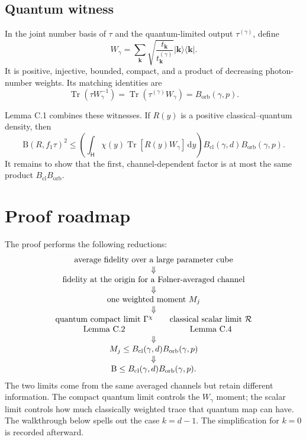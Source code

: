 \documentclass[11pt]{article}
\newcommand{\Hc}{\mathsf H}
\newcommand{\Tr}{\operatorname{Tr}}
\newcommand{\dd}{\,\mathrm d}
\newcommand{\B}{\mathrm B}
\newcommand{\Bcl}{B_{\mathrm{cl}}}
\newcommand{\Borb}{B_{\mathrm{orb}}}
\begin{document}
\subsection{Quantum witness}

In the joint number basis of $\tau$ and the quantum-limited output
$\tau^{(\gamma)}$, define
\begin{equation}\label{eq:W}
  W_\gamma
  =\sum_{\mathbf k}
  \sqrt{\frac{t_{\mathbf k}}{t_{\mathbf k}^{(\gamma)}}}
  |\mathbf k\rangle\!\langle\mathbf k|.
\end{equation}
It is positive, injective, bounded, compact, and a product of decreasing
photon-number weights.  Its matching identities are
\begin{equation}\label{eq:quantum-id}
  \Tr(\tau W_\gamma^{-1})
  =\Tr(\tau^{(\gamma)}W_\gamma)
  =\Borb(\gamma,p).
\end{equation}

Lemma C.1 combines these witnesses.  If $R(y)$ is a positive
classical--quantum density, then
\begin{equation}\label{eq:weighted-hybrid}
  \B(R,f_1\tau)^2
  \leq
  \left(\int_{\Hc}\chi(y)\Tr[R(y)W_\gamma]\dd y\right)
  \Bcl(\gamma,d)\Borb(\gamma,p).
\end{equation}
It remains to show that the first, channel-dependent factor is at most the
same product $\Bcl\Borb$.

\section{Proof roadmap}

The proof performs the following reductions:
\[
\begin{array}{c}
\text{average fidelity over a large parameter cube}\\
\Downarrow\\
\text{fidelity at the origin for a F\o lner-averaged channel}\\
\Downarrow\\
\text{one weighted moment }M_j\\
\Downarrow\\
\begin{array}{c@{\qquad}c}
\text{quantum compact limit }\Gamma^\chi
&\text{classical scalar limit }\mathcal R\\
\text{Lemma C.2}&\text{Lemma C.4}
\end{array}\\
\Downarrow\\
M_j\leq\Bcl(\gamma,d)\Borb(\gamma,p)\\
\Downarrow\\
\B\leq\Bcl(\gamma,d)\Borb(\gamma,p).
\end{array}
\]
The two limits come from the same averaged channels but retain different
information.  The compact quantum limit controls the $W_\gamma$ moment; the
scalar limit controls how much classically weighted trace that quantum map
can have.  The walkthrough below spells out the case $k=d-1$.  The
simplification for $k=0$ is recorded afterward.
\end{document}
